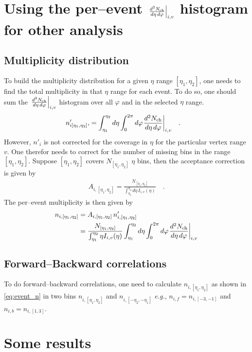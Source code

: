 \documentclass[11pt]{article}
\newcommand{\mult}[1][]{\ensuremath N_{\text{ch}#1}}
\newcommand{\dndetadphi}[1][]{{\ensuremath%
    \ifx|#1|\else\left.\fi%
    \frac{d^2\mult{}}{d\eta\,d\varphi}%
    \ifx|#1|\else\right|_{#1}\fi%
}}
\begin{document}
\section{Using the per--event $\dndetadphi[i,v]$ histogram for other
  analysis} 

\subsection{Multiplicity distribution} 

To build the multiplicity distribution for a given $\eta$ range
$[\eta_1,\eta_2]$, one needs to find the total multiplicity in that
$\eta$ range for each event. To do so, one should sum the
$\dndetadphi[i,v]$ histogram over all $\varphi$ and in the selected
$\eta$ range.
\begin{align}
  n'_{i[\eta_1,\eta_2]}, &= \int_{\eta_1}^{\eta_2}d\eta\int_0^{2\pi}d\varphi
  \dndetadphi[i,v]\quad.\nonumber
\end{align}
However, $n'_i$ is not corrected for the coverage in $\eta$ for the
particular vertex range $v$.  One therefor needs to correct for the
number of missing bins in the range $[\eta_1,\eta_2]$.  Suppose
$[\eta_1,\eta_2]$ covers $N_{[\eta_1,\eta_2]}$ $\eta$ bins, then the acceptance
correction is given by 
\begin{align}
  A_{i,[\eta_1,\eta_2]} = \frac{N_{[\eta_1,\eta_2]}}{\int_{\eta_1}^{\eta_2}d\eta\,
    I_{i,v}(\eta)}\quad.\nonumber
\end{align}
The per--event multiplicity is then given by 
\begin{align}
  n_{i,[\eta_1,\eta_2]} &= A_{i,[\eta_1,\eta_2]}\,n'_{i,[\eta_1,\eta_2]}\nonumber\\
  &= \frac{N_{[\eta_1,\eta_2]}}{\int_{\eta_1}^{\eta_2}\eta
    I_{i,v}(\eta)} \int_{\eta_1}^{\eta_2}d\eta\int_0^{2\pi}d\varphi
  \dndetadphi[i,v]
  \label{eq:event_n}
\end{align}

\subsection{Forward--Backward correlations} 

To do forward--backward correlations, one need to calculate
$n_{i,[\eta_1,\eta_2]}$ as shown in \eqref{eq:event_n} in two bins
$n_{i,[\eta_1,\eta_2]}$ and $n_{i,[-\eta_2,-\eta_1]}$ \textit{e.g.},
$n_{i,f}=n_{i,[-3,-1]}$ and $n_{i,b}=n_{i,[1,3]}$. 

\clearpage
\section{Some results}
\end{document}
